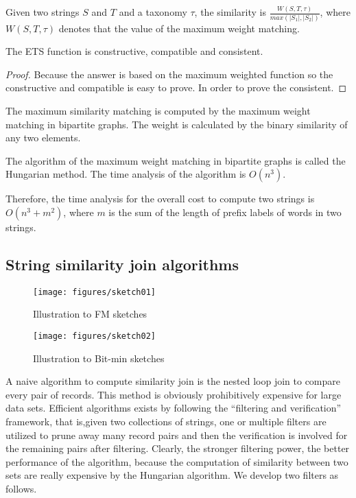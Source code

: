 \begin{definition}  Given two strings $S$ and $T$ and a taxonomy $\tau$, the similarity is   $\frac{W(S,T,\tau)}{max(|S_1|,|S_2|)}$, where $W(S,T,\tau)$ denotes that the value of the maximum weight matching.  \label{def:efs}
\end{definition}

\smallskip

\begin{lem}  The ETS function is constructive, compatible and consistent.
\end{lem}
\begin{proof} Because the answer is based on the maximum weighted function so the constructive and compatible is easy to prove. In order to prove the consistent.
\end{proof}

The maximum  similarity  matching is computed by the maximum weight matching in bipartite graphs. The weight is calculated by the binary similarity of any two elements.

The algorithm of the maximum weight matching in bipartite graphs is called the Hungarian method. The time analysis of the algorithm is $O(n^3)$.


Therefore, the  time analysis for the overall cost to compute two strings is $O(n^3+m^2)$, where $m$ is the sum of the length of prefix labels of words in two strings.





\subsection{String similarity join algorithms}


\begin{figure}[t]
\centering
\texttt{[image: figures/sketch01]}
 \caption{Illustration to FM sketches }
\label{fig:similaritygeaph}
\end{figure}


\begin{figure}
\centering
\texttt{[image: figures/sketch02]}
 \caption{Illustration to Bit-min sketches }
\label{fig:similaritygeaph}
\end{figure}

A naive algorithm to compute similarity join is the nested loop join to compare every pair of records. This method is obviously prohibitively expensive for large data sets. Efficient algorithms exists by following the ``filtering and verification'' framework, that is,given two collections of strings, one or multiple filters are utilized to prune away many record pairs and then the verification is involved for the remaining pairs after filtering. Clearly, the stronger filtering power, the better performance of the algorithm, because the computation of similarity between two sets are really expensive by the Hungarian algorithm. We develop two filters as follows.

